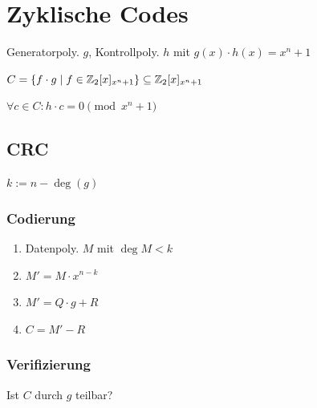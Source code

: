 \section*{Zyklische Codes}

Generatorpoly. $g$, Kontrollpoly. $h$ mit
$g(x) \cdot h(x) = x^n + 1$

$C = \{f \cdot g \mid f \in \mathbb{Z}_2[x]_{x^n + 1}\} \subseteq \mathbb{Z}_2[x]_{x^n + 1}$

$\forall c \in C: h \cdot c = 0 \pmod{x^n+1}$

\subsection*{CRC}
$k := n - \deg(g)$

\subsubsection*{Codierung}
\begin{enumerate}
	\item Datenpoly. $M$ mit $\deg M < k$
	\item $M' = M \cdot x^{n-k}$
	\item $M' = Q \cdot g + R$
	\item $C = M' - R$
\end{enumerate}

\subsubsection*{Verifizierung}
Ist $C$ durch $g$ teilbar?


